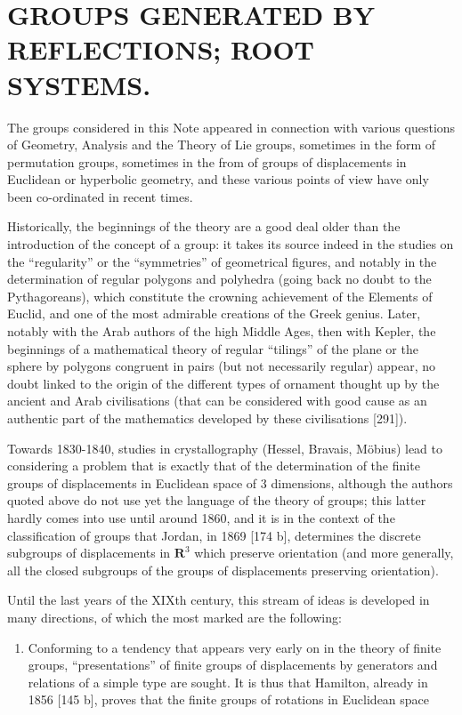 \chapter{GROUPS GENERATED BY REFLECTIONS; ROOT SYSTEMS.}

The groups considered in this Note appeared in connection with various questions of Geometry, Analysis and the Theory of Lie groups, sometimes in the form of permutation groups, sometimes in the from of groups of displacements in Euclidean or hyperbolic geometry, and these various points of view have only been co-ordinated in recent times.

Historically, the beginnings of the theory are a good deal older than the introduction of the concept of a group: it takes its source indeed in the studies on the ``regularity'' or the ``symmetries'' of geometrical figures, and notably in the determination of regular polygons and polyhedra (going back no doubt to the Pythagoreans), which constitute the crowning achievement of the Elements of Euclid, and one of the most admirable creations of the Greek genius. Later, notably with the Arab authors of the high Middle Ages, then with Kepler, the beginnings of a mathematical theory of regular ``tilings'' of the plane or the sphere by polygons congruent in pairs (but not necessarily regular) appear, no doubt linked to the origin of the different types of ornament thought up by the ancient and Arab civilisations (that can be considered with good cause as an authentic part of the mathematics developed by these civilisations {[}291{]}).

Towards 1830-1840, studies in crystallography (Hessel, Bravais, Möbius) lead to considering a problem that is exactly that of the determination of the finite groups of displacements in Euclidean space of 3 dimensions, although the authors quoted above do not use yet the language of the theory of groups; this latter hardly comes into use until around 1860, and it is in the context of the classification of groups that Jordan, in 1869 {[}174 b{]}, determines the discrete subgroups of displacements in \(\mathbf{R}^3\) which preserve orientation (and more generally, all the closed subgroups of the groups of displacements preserving orientation).

Until the last years of the XIXth century, this stream of ideas is developed in many directions, of which the most marked are the following:

\begin{enumerate}
\def\labelenumi{\arabic{enumi}.}
\tightlist
\item
  Conforming to a tendency that appears very early on in the theory of finite groups, ``presentations'' of finite groups of displacements by generators and relations of a simple type are sought. It is thus that Hamilton, already in 1856 {[}145 b{]}, proves that the finite groups of rotations in Euclidean space
\end{enumerate}


